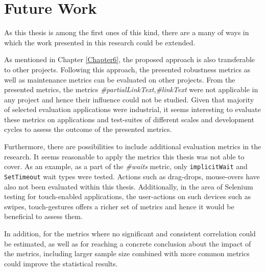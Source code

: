 

\newpage
\section{Future Work}
\label{futurework}
As this thesis is among the first ones of this kind, there are a many of ways in which the work presented in this research could be extended.

As mentioned in Chapter \ref{Chapter6}, the proposed approach is also transferable to other projects. Following this approach, the presented robustness metrics as well as maintenance metrics can be evaluated on other projects. From the presented metrics, the metrics \textit{\#partialLinkText},\textit{\#linkText} were not applicable in any project and hence their influence could not be studied. Given that majority of selected evaluation applications were industrial, it seems interesting to evaluate these metrics on applications and test-suites of different scales and development cycles to assess the outcome of the presented metrics. 

Furthermore, there are possibilities to include additional evaluation metrics in the research. It seems reasonable to apply the metrics this thesis was not able to cover. As an example, as a part of the \textit{\#waits} metric, only \texttt{implicitWait} and \texttt{SetTimeout} wait types were tested. Actions such as drag-drops, mouse-overs have also not been evaluated within this thesis. Additionally, in the area of Selenium testing for touch-enabled applications, the user-actions on such devices such as swipes, touch-gestures offers a richer set of metrics and hence it would be beneficial to assess them. 

In addition, for the metrics where no significant and consistent correlation could be estimated, as well as for reaching a concrete conclusion about the impact of the metrics, including larger sample size combined with more common metrics could improve the statistical results. 


